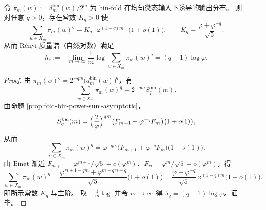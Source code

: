 \begin{theorem}\label{thm:fold-bin-renyi-mass-spectrum-affine}
令 \(\pi_m(w):=d_m^{\mathrm{bin}}(w)/2^m\) 为 bin-fold 在均匀微态输入下诱导的输出分布。
则对任意 \(q>0\)，存在常数 \(K_q>0\) 使
\[
\sum_{w\in X_m}\pi_m(w)^q
=
K_q\cdot \varphi^{(1-q)m}\cdot\bigl(1+o(1)\bigr),
\qquad
K_q=\frac{\varphi+\varphi^{-q}}{\sqrt5}.
\]
从而 Rényi 质量谱（自然对数）满足
\[
h_q:=-\lim_{m\to\infty}\frac{1}{m}\log\sum_{w\in X_m}\pi_m(w)^q
=(q-1)\log\varphi.
\]
\end{theorem}
\begin{proof}
由 \(\pi_m(w)^q=2^{-qm}\bigl(d_m^{\mathrm{bin}}(w)\bigr)^q\)，有
\[
\sum_{w\in X_m}\pi_m(w)^q
=2^{-qm}S_q^{\mathrm{bin}}(m).
\]
由命题 \ref{prop:fold-bin-power-sum-asymptotic}，
\[
S_q^{\mathrm{bin}}(m)
=\Bigl(\frac{2}{\varphi}\Bigr)^{qm}\bigl(F_{m+1}+\varphi^{-q}F_m\bigr)\bigl(1+o(1)\bigr),
\]
从而
\[
\sum_{w\in X_m}\pi_m(w)^q
=\varphi^{-qm}\bigl(F_{m+1}+\varphi^{-q}F_m\bigr)\bigl(1+o(1)\bigr).
\]
由 Binet 渐近 \(F_{m+1}=\varphi^{m+1}/\sqrt5+o(\varphi^m)\)、\(F_m=\varphi^m/\sqrt5+o(\varphi^m)\)，得
\[
\sum_{w\in X_m}\pi_m(w)^q
=\frac{\varphi^{m+1-qm}+\varphi^{m-qm-q}}{\sqrt5}\bigl(1+o(1)\bigr)
=\frac{\varphi+\varphi^{-q}}{\sqrt5}\,\varphi^{(1-q)m}\bigl(1+o(1)\bigr),
\]
即所示常数 \(K_q\) 与主阶。
取 \(-\frac{1}{m}\log\) 并令 \(m\to\infty\) 得 \(h_q=(q-1)\log\varphi\)。证毕。
\end{proof}

\endinput
